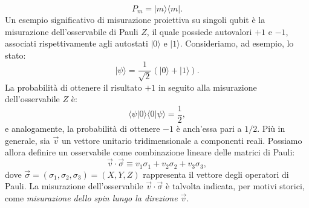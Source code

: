 \documentclass[a4paper,12pt]{report}
\theoremstyle{plain}
\begin{document}
\[
P_m = |m\rangle \langle m|.
\]
Un esempio significativo di misurazione proiettiva su singoli qubit è la misurazione dell'osservabile di Pauli $Z$, il quale possiede autovalori $+1$ e $-1$, associati rispettivamente agli autostati $|0\rangle$ e $|1\rangle$. Consideriamo, ad esempio, lo stato:
\[
|\psi\rangle = \frac{1}{\sqrt{2}}(|0\rangle + |1\rangle).
\]
La probabilità di ottenere il risultato $+1$ in seguito alla misurazione dell'osservabile $Z$ è:
\[
\langle \psi | 0 \rangle \langle 0 | \psi \rangle = \frac{1}{2},
\]
e analogamente, la probabilità di ottenere $-1$ è anch'essa pari a $1/2$.
Più in generale, sia $\vec{v}$ un vettore unitario tridimensionale a componenti reali. Possiamo allora definire un osservabile come combinazione lineare delle matrici di Pauli:
\[
\vec{v} \cdot \vec{\sigma} \equiv v_1 \sigma_1 + v_2 \sigma_2 + v_3 \sigma_3,
\]
dove $\vec{\sigma} = (\sigma_1, \sigma_2, \sigma_3) = (X, Y, Z)$ rappresenta il vettore degli operatori di Pauli. La misurazione dell'osservabile $\vec{v} \cdot \vec{\sigma}$ è talvolta indicata, per motivi storici, come \textit{misurazione dello spin lungo la direzione $\vec{v}$}.
\end{document}
